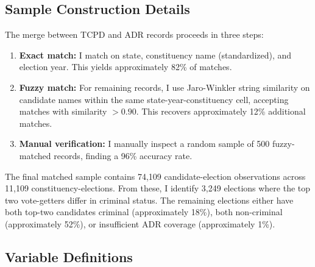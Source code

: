 \documentclass[12pt]{article}
\begin{document}
\subsection{Sample Construction Details}

The merge between TCPD and ADR records proceeds in three steps:

\begin{enumerate}
    \item \textbf{Exact match:} I match on state, constituency name (standardized), and election year. This yields approximately 82\% of matches.
    \item \textbf{Fuzzy match:} For remaining records, I use Jaro-Winkler string similarity on candidate names within the same state-year-constituency cell, accepting matches with similarity $> 0.90$. This recovers approximately 12\% additional matches.
    \item \textbf{Manual verification:} I manually inspect a random sample of 500 fuzzy-matched records, finding a 96\% accuracy rate.
\end{enumerate}

The final matched sample contains 74,109 candidate-election observations across 11,109 constituency-elections. From these, I identify 3,249 elections where the top two vote-getters differ in criminal status. The remaining elections either have both top-two candidates criminal (approximately 18\%), both non-criminal (approximately 52\%), or insufficient ADR coverage (approximately 1\%).

\subsection{Variable Definitions}
\end{document}
